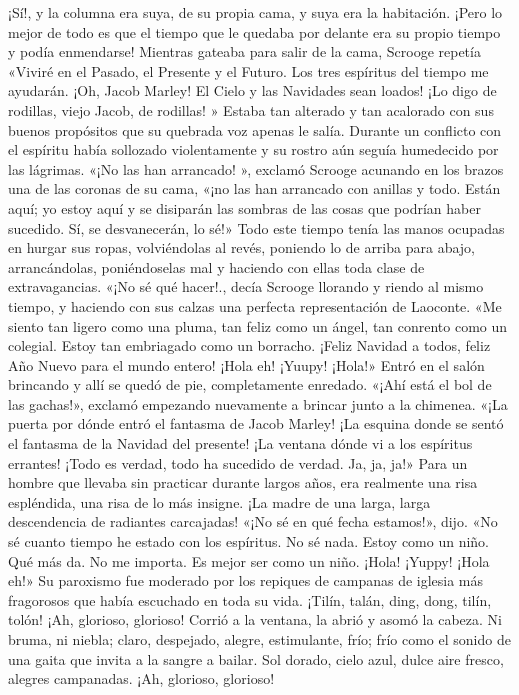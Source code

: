 \documentclass{novela}
\begin{document}
 ¡Sí!, y la columna era suya, de su propia cama, y suya era la habitación. ¡Pero lo mejor de todo es que el tiempo que le quedaba por delante era su propio tiempo y podía enmendarse!
 Mientras gateaba para salir de la cama, Scrooge repetía «Viviré en el Pasado, el Presente y el Futuro. Los tres espíritus del tiempo me ayudarán. ¡Oh, Jacob Marley! El Cielo y las Navidades sean loados! ¡Lo digo de rodillas, viejo Jacob, de rodillas! »
 Estaba tan alterado y tan acalorado con sus buenos propósitos que su quebrada voz apenas le salía. Durante un conflicto con el espíritu había sollozado violentamente y su rostro aún seguía humedecido por las lágrimas.
 «¡No las han arrancado! », exclamó Scrooge acunando en los brazos una de las coronas de su cama, «¡no las han arrancado con anillas y todo. Están aquí; yo estoy aquí y se disiparán las sombras de las cosas que podrían haber sucedido. Sí, se desvanecerán, lo sé!»
 Todo este tiempo tenía las manos ocupadas en hurgar sus ropas, volviéndolas al revés, poniendo lo de arriba para abajo, arrancándolas, poniéndoselas mal y haciendo con ellas toda clase de extravagancias.
 «¡No sé qué hacer!., decía Scrooge llorando y riendo al mismo tiempo, y haciendo con sus calzas una perfecta representación de Laoconte. «Me siento tan ligero como una pluma, tan feliz como un ángel, tan conrento como un colegial. Estoy tan embriagado como un borracho. ¡Feliz Navidad a todos, feliz Año Nuevo para el mundo entero! ¡Hola eh! ¡Yuupy! ¡Hola!»
 Entró en el salón brincando y allí se quedó de pie, completamente enredado.
 «¡Ahí está el bol de las gachas!», exclamó empezando nuevamente a brincar junto a la chimenea. «¡La puerta por dónde entró el fantasma de Jacob Marley! ¡La esquina donde se sentó el fantasma de la Navidad del presente! ¡La ventana dónde vi a los espíritus errantes! ¡Todo es verdad, todo ha sucedido de verdad. Ja, ja, ja!»
 Para un hombre que llevaba sin practicar durante largos años, era realmente una risa espléndida, una risa de lo más insigne. ¡La madre de una larga, larga descendencia de radiantes carcajadas!
 «¡No sé en qué fecha estamos!», dijo. «No sé cuanto tiempo he estado con los espíritus. No sé nada. Estoy como un niño. Qué más da. No me importa. Es mejor ser como un niño. ¡Hola! ¡Yuppy! ¡Hola eh!»
 Su paroxismo fue moderado por los repiques de campanas de iglesia más fragorosos que había escuchado en toda su vida. ¡Tilín, talán, ding, dong, tilín, tolón! ¡Ah, glorioso, glorioso!
 Corrió a la ventana, la abrió y asomó la cabeza. Ni bruma, ni niebla; claro, despejado, alegre, estimulante, frío; frío como el sonido de una gaita que invita a la sangre a bailar. Sol dorado, cielo azul, dulce aire fresco, alegres campanadas. ¡Ah, glorioso, glorioso!
\end{document}
